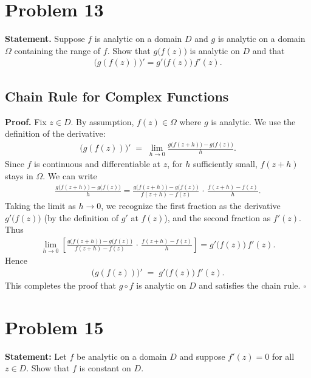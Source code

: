 \documentclass[12pt]{article}
\theoremstyle{definition} %
\theoremstyle{plain} %
\begin{document}
\section*{Problem 13}

\textbf{Statement.} 
Suppose $f$ is analytic on a domain $D$ and $g$ is analytic on a domain $\Omega$ containing the range of $f$. Show that $g\bigl(f(z)\bigr)$ is analytic on $D$ and that 
\begin{align}
\bigl(g(f(z))\bigr)' = g'\bigl(f(z)\bigr)\,f'(z).
\end{align}

\subsection*{Chain Rule for Complex Functions}

\textbf{Proof.}
Fix $z \in D$. By assumption, $f(z) \in \Omega$ where $g$ is analytic. We use the definition of the derivative:
\begin{align}
\bigl(g(f(z))\bigr)'
\;=\;
\lim_{h \to 0}
\frac{g\bigl(f(z + h)\bigr) - g\bigl(f(z)\bigr)}{h}.
\end{align}
Since $f$ is continuous and differentiable at $z$, for $h$ sufficiently small, $f(z + h)$ stays in $\Omega$. We can write
\begin{align}
\frac{g\bigl(f(z + h)\bigr) - g\bigl(f(z)\bigr)}{h}
=
\frac{g\bigl(f(z + h)\bigr) - g\bigl(f(z)\bigr)}{f(z + h) - f(z)}
\,\cdot\,
\frac{f(z + h) - f(z)}{h}.
\end{align}
Taking the limit as $h \to 0$, we recognize the first fraction as the derivative $g'\bigl(f(z)\bigr)$ (by the definition of $g'$ at $f(z)$), and the second fraction as $f'(z)$. Thus
\begin{align}
\lim_{h \to 0} 
\left[
\frac{g\bigl(f(z + h)\bigr) - g\bigl(f(z)\bigr)}{f(z + h) - f(z)}
\,\cdot\,
\frac{f(z + h) - f(z)}{h}
\right]
=
g'\bigl(f(z)\bigr)\,f'(z).
\end{align}
Hence 
\begin{align}
\bigl(g(f(z))\bigr)' \;=\; g'\bigl(f(z)\bigr)\,f'(z).
\end{align}
This completes the proof that $g \circ f$ is analytic on $D$ and satisfies the chain rule. 
\quad $\square$

\section*{Problem 15}
\textbf{Statement:} Let $f$ be analytic on a domain $D$ and suppose $f'(z)=0$ for all $z\in D$. Show that $f$ is constant on $D$.
\end{document}
